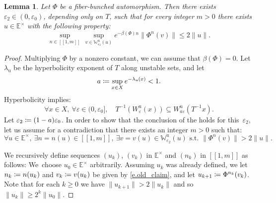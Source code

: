 \documentclass[JEP,XML,SOM,Unicode]{cedram}
\newcommand{\ldbrack}{[\![}
\newcommand{\rdbrack}{]\!]}
\def\vcentcolon{\mathrel{\mathop\ordinarycolon}}
\providecommand\ordinarycolon{:}
\providecommand*\coloneqq{\vcentcolon\mathrel{\mkern-1.2mu}=}
\theoremstyle{plain}
\newtheorem{lemma}[theorem]{Lemma}
\theoremstyle{definition}
\newcommand{\EE}{\mathbb{E}}
\newcommand{\WW}{\mathbb{W}}
\newcommand{\uu}{\mathrm{u}}
\let\epsilon\varepsilon
\begin{document}
\begin{lemma}\label{l.anti_claim}
Let $\Phi$ be a fiber-bunched automorphism.
Then there exists $\epsilon_2 \in (0,\epsilon_0)$, depending only on $T$, such that for every integer $m > 0$ there exists $u \in \EE^\times$ with the following property:
\[
\sup_{n \in \ldbrack 1, m \rdbrack} \, \sup_{v \in \WW^\uu_{\epsilon_2} (u)} e^{-\beta(\Phi) n} \| \Phi^n (v) \| \le 2 \|u\|.
\]
\end{lemma}

\begin{proof}
Multiplying $\Phi$ by a nonzero constant, we can assume that $\beta(\Phi) = 0$.
Let~$\lambda_\uu$ be the hyperbolicity exponent of $T$ along unstable sets, and let
\begin{equation}\label{e.hyp_rate}
a \coloneqq \sup_{x \in X} e^{-\lambda_\uu(x)} < 1.
\end{equation}
Hyperbolicity implies:
\begin{equation}\label{e.W_contraction}
\forall x \in X, \ \forall \epsilon \in (0, \epsilon_0], \quad
T^{-1}(W^\uu_\epsilon(x)) \subseteq W^\uu_{a\epsilon}(T^{-1} x).
\end{equation}
Let $\epsilon_2 \coloneqq (1-a)\epsilon_0$.
In order to show that the conclusion of the  holds for this~$\epsilon_2$,
let us assume for a contradiction that there exists an integer $m > 0$
such that:
\begin{equation}\label{e.old_claim}
\forall u \in \EE^\times, \
\exists n=n(u) \in \ldbrack 1, m \rdbrack, \
\exists v=v(u) \in \WW^\uu_{\epsilon_2} (u) \text{ s.t.\ }
\| \Phi^n (v) \| > 2 \|u\|.
\end{equation}

We recursively define sequences $(u_k)$, $(v_k)$ in $\EE^\times$ and $(n_k)$ in $\ldbrack 1, m \rdbrack$ as follows:
We~choose $u_0 \in \EE^\times$ arbitrarily.
Assuming $u_k$ was already defined, we let $n_k \coloneqq n(u_k)$ and $v_k \coloneqq v(u_k)$ be given by \eqref{e.old_claim}, and let $u_{k+1} \coloneqq \Phi^{n_k}(v_k)$.
Note that for each $k\ge 0$ we have
$\|u_{k+1}\| > 2 \|u_k\|$ and so $\| u_k \| \ge 2^k \|u_0\|$.


\end{proof}
\end{document}
